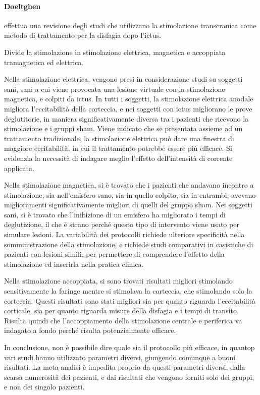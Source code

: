\paragraph{Doeltghen}\label{par:doe} \cite{Doeltgen2015} effettua una revisione 
degli studi che utilizzano la stimolazione transcranica come metodo di 
trattamento per la disfagia dopo l'ictus.

Divide la stimolazione in stimolazione elettrica, magnetica e accoppiata 
tramagnetica ed elettrica.

Nella stimolazione elettrica, vengono presi in considerazione studi su soggetti 
sani, sani a cui viene provocata una lesione virtuale con la stimolazione 
magnetica, e colpiti da ictus.
In tutti i soggetti, la stimolazione elettrica anodale migliora l'eccitabilità 
della corteccia, e nei soggetti con ictus migliorano le prove deglutitorie, in 
maniera significativamente diversa tra i pazienti che ricevono la stimolazione 
e i gruppi sham.
Viene indicato che se presentata assieme ad un trattamento tradizionale, la 
stimolazione elettrica può dare una finestra di maggiore eccitabilità, in cui 
il trattamento potrebbe essere più efficace.
Si evidenzia la necessità di indagare meglio l'effetto dell'intensità di 
corrente applicata.

Nella stimolazione magnetica, si è trovato che i pazienti che andavano incontro 
a stimolazione, sia nell'emisfero sano, sia in quello colpito, sia in entrambi, 
avevano miglioramenti significativamente migliori di quelli del gruppo sham.
Nei soggetti sani, si è trovato che l'inibizione di un emisfero ha migliorato i 
tempi di deglutizione, il che è strano perché questo tipo di intervento viene 
usato per simulare lesioni.
La variabilità dei protocolli richiede ulteriore specificità nella 
somministrazione della stimolazione, e richiede studi comparativi in casistiche 
di pazienti con lesioni simili, per permettere di comprendere l'effetto della 
stimolazione ed inserirla nella pratica clinica.

Nella stimolazione accoppiata, si sono trovati risultati migliori stimolando 
sensitivamente la faringe mentre si stimolava la corteccia, che stimolando solo 
la corteccia.
Questi risultati sono stati migliori sia per quanto riguarda l'eccitabilità 
corticale, sia per quanto riguarda misure della disfagia e i tempi di transito.
Risulta quindi che l'accoppiamento della stimolazione centrale e periferica va 
indagato a fondo perché risulta potenzialmente efficace.

In conclusione, non è possibile dire quale sia il protocollo più efficace, in 
quantop vari studi hanno utilizzato parametri diversi, giungendo comunque a 
buoni risultati.
La meta-analisi è impedita proprio da questi parametri diversi, dalla scarsa 
numerosità dei pazienti, e dai risultati che vengono forniti solo dei gruppi, e 
non dei singolo pazienti.

